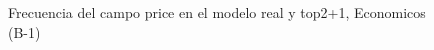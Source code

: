 \begin{figure}[H]
    \centering
    
    \caption{Frecuencia del campo  price en el modelo real y top2+1, Economicos (B-1)}
    \label{frecuency- Price-top2+1}
\end{figure}